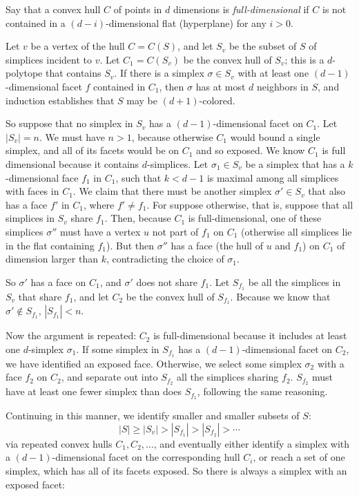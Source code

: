 \pdfoutput=1  \documentclass[]{article}
\def\s{{\sigma}}
\begin{document}
Say that a convex hull $C$ of points in $d$ dimensions is \emph{full-dimensional}
if $C$ is not contained in a $(d{-}i)$-dimensional flat (hyperplane)
for any $i > 0$.

Let $v$ be a vertex of the hull $C=C(S)$, and let $S_v$ be the subset of
$S$ of simplices incident to $v$.
Let $C_1=C(S_v)$ be the convex hull of $S_v$;
this is a $d$-polytope that contains $S_v$.
If there is a simplex $\s \in S_v$ with at least one
$(d{-}1)$-dimensional facet $f$ 
contained in $C_1$, then $\s$ has at most $d$ neighbors in $S$,
and induction establishes that $S$ may be $(d{+}1)$-colored.

So suppose that no simplex in $S_v$ has a $(d{-}1)$-dimensional facet on $C_1$.
Let $|S_v|=n$.
We must have $n>1$, because otherwise $C_1$ would bound a single
simplex,
and all of its facets would be on $C_1$ and so exposed.
We know $C_1$ is full dimensional because it contains $d$-simplices.
Let $\s_1 \in S_v$ be a simplex that has a $k$-dimensional face $f_1$ in
$C_1$, such that
$k < d-1$ is maximal among all simplices with faces in $C_1$.
We claim that there must be another simplex $\s' \in S_v$ that also has a face $f'$ in
$C_1$, where $f' \neq f_1$.
For suppose otherwise, that is, suppose that all simplices in $S_v$
share $f_1$.  Then, because $C_1$ is full-dimensional,
one of these simplices $\s''$ must have a vertex $u$ not part of $f_1$
on $C_1$
(otherwise all simplices lie in the flat containing $f_1$).
But then $\s''$ has a face (the hull of $u$ and $f_1$)
on $C_1$ of dimension larger than $k$,
contradicting the choice of $\s_1$.

So $\s'$ has a face on $C_1$, and $\s'$ does not share $f_1$.
Let $S_{f_1}$ be all the simplices in $S_v$ that share
$f_1$, and
let $C_2$ be the convex hull of $S_{f_1}$.
Because we know that $\s' \not\in S_{f_1}$,
$|S_{f_1}| < n$.

Now the argument is repeated: $C_2$ is full-dimensional because it
includes at least one $d$-simplex $\s_1$.
If some simplex in $S_{f_1}$ has a $(d{-}1)$-dimensional facet on
$C_2$,
we have identified an exposed face.
Otherwise, we select some simplex $\s_2$ with a face $f_2$ on $C_2$,
and separate out into $S_{f_2}$ all the simplices sharing $f_2$.
$S_{f_2}$ must have at least one fewer simplex than does $S_{f_1}$,
following the same reasoning.

Continuing in this manner, we identify smaller and smaller subsets of
$S$:
$$
|S| \ge |S_v| > |S_{f_1}| > |S_{f_2}| > \cdots
$$
via repeated convex hulls $C_1, C_2, \ldots$,
and eventually either identify a simplex with a $(d{-}1)$-dimensional
facet on
the corresponding hull $C_i$, or reach a set of one simplex, which
has all of its facets exposed.
So there is always a simplex with an exposed facet:
\end{document}
